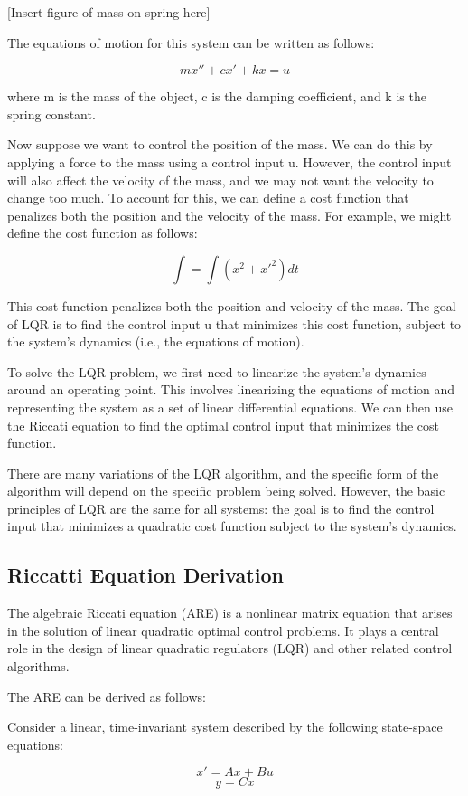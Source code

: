 \documentclass[12pt]{article}
\begin{document}
[Insert figure of mass on spring here]

The equations of motion for this system can be written as follows:

$$mx'' + cx' + kx = u$$

where m is the mass of the object, c is the damping coefficient, and k is the spring constant.

Now suppose we want to control the position of the mass. We can do this by applying a force to the mass using a control input u. However, the control input will also affect the velocity of the mass, and we may not want the velocity to change too much. To account for this, we can define a cost function that penalizes both the position and the velocity of the mass. For example, we might define the cost function as follows:

$$\int = \int(x^2 + x'^2)dt$$

This cost function penalizes both the position and velocity of the mass. The goal of LQR is to find the control input u that minimizes this cost function, subject to the system's dynamics (i.e., the equations of motion).

To solve the LQR problem, we first need to linearize the system's dynamics around an operating point. This involves linearizing the equations of motion and representing the system as a set of linear differential equations. We can then use the Riccati equation to find the optimal control input that minimizes the cost function.

There are many variations of the LQR algorithm, and the specific form of the algorithm will depend on the specific problem being solved. However, the basic principles of LQR are the same for all systems: the goal is to find the control input that minimizes a quadratic cost function subject to the system's dynamics.
\subsection{Riccatti Equation Derivation}
The algebraic Riccati equation (ARE) is a nonlinear matrix equation that arises in the solution of linear quadratic optimal control problems. It plays a central role in the design of linear quadratic regulators (LQR) and other related control algorithms.

The ARE can be derived as follows:

Consider a linear, time-invariant system described by the following state-space equations:

$$x' = Ax + Bu$$
$$y = Cx$$
\end{document}
